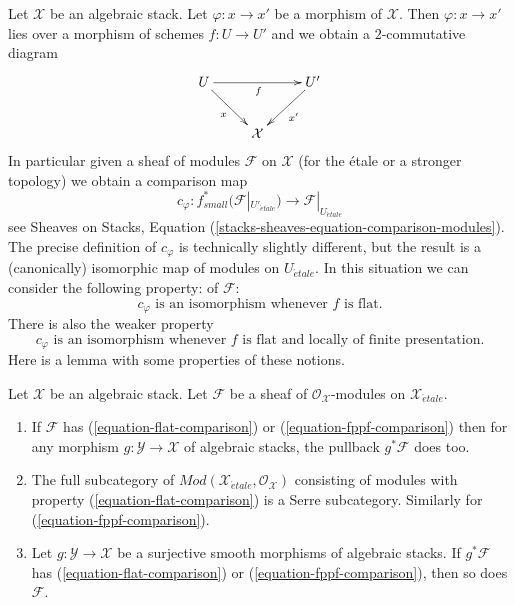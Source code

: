 \noindent
Let $\mathcal{X}$ be an algebraic stack. Let $\varphi : x \to x'$ be
a morphism of $\mathcal{X}$. Then $\varphi : x \to x'$ lies over a
morphism of schemes $f : U \to U'$ and we obtain a $2$-commutative diagram
$$
\xymatrix{
U \ar[rd]_x \ar[rr]_f & & U' \ar[ld]^{x'} \\
& \mathcal{X}
}
$$
In particular given a sheaf of modules $\mathcal{F}$ on $\mathcal{X}$
(for the \'etale or a stronger topology) we obtain a comparison map
\begin{equation}
\label{equation-comparison-modules}
c_\varphi :
f_{small}^*(\mathcal{F}|_{U'_{\acute{e}tale}})
\longrightarrow
\mathcal{F}|_{U_{\acute{e}tale}}
\end{equation}
see Sheaves on Stacks, Equation
(\ref{stacks-sheaves-equation-comparison-modules}).
The precise definition of
$c_\varphi$ is technically slightly different, but the result is a
(canonically) isomorphic map of modules on $U_{\acute{e}tale}$.
In this situation we can consider the following property:
of $\mathcal{F}$:
\begin{equation}
\label{equation-flat-comparison}
c_\varphi\text{ is an isomorphism whenever }f\text{ is flat.}
\end{equation}
There is also the weaker property
\begin{equation}
\label{equation-fppf-comparison}
c_\varphi\text{ is an isomorphism whenever }f
\text{ is flat and locally of finite presentation.}
\end{equation}
Here is a lemma with some properties of these notions.

\begin{lemma}
\label{lemma-check-flat-comparison-on-etale-covering}
Let $\mathcal{X}$ be an algebraic stack. Let $\mathcal{F}$
be a sheaf of $\mathcal{O}_\mathcal{X}$-modules on
$\mathcal{X}_{\acute{e}tale}$.
\begin{enumerate}
\item If $\mathcal{F}$ has (\ref{equation-flat-comparison}) or
(\ref{equation-fppf-comparison}) then for any morphism
$g : \mathcal{Y} \to \mathcal{X}$ of algebraic stacks, the
pullback $g^*\mathcal{F}$ does too.
\item The full subcategory of
$\textit{Mod}(\mathcal{X}_{\acute{e}tale}, \mathcal{O}_\mathcal{X})$
consisting of modules with property (\ref{equation-flat-comparison})
is a Serre subcategory. Similarly for (\ref{equation-fppf-comparison}).
\item  Let $g : \mathcal{Y} \to \mathcal{X}$ be a surjective smooth
morphisms of algebraic stacks. If $g^*\mathcal{F}$
has (\ref{equation-flat-comparison}) or (\ref{equation-fppf-comparison}),
then so does $\mathcal{F}$.
\end{enumerate}
\end{lemma}


